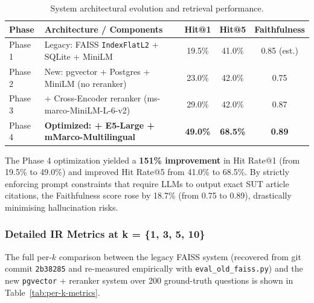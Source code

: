 \documentclass[11pt, a4paper]{article}
\begin{document}
\begin{table}[H]
    \centering
    \footnotesize
    \caption{System architectural evolution and retrieval performance.}
    \label{tab:phase-evolution}
    \begin{tabular}{lp{7.5cm}ccc}
        \toprule
        \textbf{Phase} & \textbf{Architecture / Components} & \textbf{Hit@1} & \textbf{Hit@5} & \textbf{Faithfulness}\\
        \midrule
        Phase 1 & Legacy: FAISS \texttt{IndexFlatL2} + SQLite + MiniLM       & 19.5\% & 41.0\% & 0.85 (est.)\\
        Phase 2 & New: pgvector + Postgres + MiniLM (no reranker)            & 23.0\% & 42.0\% & 0.75 \\
        Phase 3 & + Cross-Encoder reranker (ms-marco-MiniLM-L-6-v2)          & 29.0\% & 42.0\% & 0.87 \\
        Phase 4 & \textbf{Optimized: + E5-Large + mMarco-Multilingual}       & \textbf{49.0\%} & \textbf{68.5\%} & \textbf{0.89} \\
        \bottomrule
    \end{tabular}
\end{table}

The Phase 4 optimization yielded a \textbf{151\% improvement} in Hit Rate@1 (from 19.5\% to 49.0\%) and improved Hit Rate@5 from 41.0\% to 68.5\%. By strictly enforcing prompt constraints that require LLMs to output exact SUT article citations, the Faithfulness score rose by 18.7\% (from 0.75 to 0.89), drastically minimising hallucination risks.

\subsubsection{Detailed IR Metrics at k = \{1, 3, 5, 10\}}

The full per-$k$ comparison between the legacy FAISS system (recovered from git commit \texttt{2b38285} and re-measured empirically with \texttt{eval\_old\_faiss.py}) and the new \texttt{pgvector} + reranker system over 200 ground-truth questions is shown in Table~\ref{tab:per-k-metrics}.
\end{document}
